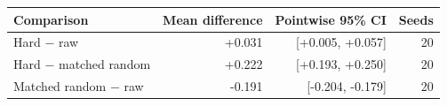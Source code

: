 \begin{tabular}{lrrr}
\toprule
Comparison & Mean difference & Pointwise 95\% CI & Seeds \\
\midrule
Hard $-$ raw & +0.031 & [+0.005, +0.057] & 20 \\
Hard $-$ matched random & +0.222 & [+0.193, +0.250] & 20 \\
Matched random $-$ raw & -0.191 & [-0.204, -0.179] & 20 \\
\bottomrule
\end{tabular}
